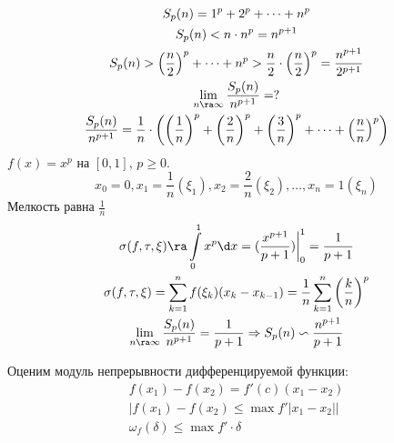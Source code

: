 \begin{exmp}
	\begin{gather*}
		S_p(n) = 1^p + 2^p + \cdots + n^p \\
		S_p(n) < n \cdot n^p = n^{p+1} \\
		S_p(n) > \left(\frac{n}{2}\right)^p + \cdots + n^p > \frac{n}{2} \cdot \left(\frac{n}{2}\right)^p = \frac{n^{p+1}}{2^{p+1}} \\
		\lim_{n \ra \infty} \frac{S_p(n)}{n^{p+1}} = ? \\
		\frac{S_p(n)}{n^{p+1}} = \frac{1}{n} \cdot \left(\left(\frac{1}{n}\right)^p + \left(\frac{2}{n}\right)^p + \left(\frac{3}{n}\right)^p + \cdots + \left(\frac{n}{n}\right)^p \right)
	\end{gather*}
	$f(x) = x^p$ на $[0, 1]$, $p\ge 0$.
	\[x_0 = 0, x_1 = \frac{1}{n} (\xi_1), x_2 = \frac{2}{n} (\xi_2), \dots, x_n = 1 (\xi_n) \]
	Мелкость равна $\frac{1}{n}$
	\begin{gather*}
		\sigma(f, \tau, \xi) \ra \int\limits_0^1 x^p \d x = (\frac{x^{p+1}}{p + 1})\biggr|_0^1 = \frac1{p + 1} \\
		\sigma(f, \tau, \xi) = \sum_{k=1}^n f(\xi_k)(x_k - x_{k-1}) = \frac{1}{n} \sum_{k=1}^n \left(\frac{k}{n}\right)^p \\
		\lim_{n \ra \infty} \frac{S_p(n)}{n^{p+1}} = \frac{1}{p+1} \Rightarrow S_p(n) \backsim \frac{n^{p+1}}{p+1} \\
	\end{gather*}
\end{exmp}

Оценим модуль непрерывности дифференцируемой функции:
\begin{gather*}
	f(x_1 ) - f(x_2) = f'(c)(x_1 - x_2) \\
	|f(x_1) - f(x_2) \le \max f'|x_1 - x_2|| \\
	\omega_f(\delta) \le \max f' \cdot \delta
\end{gather*}

